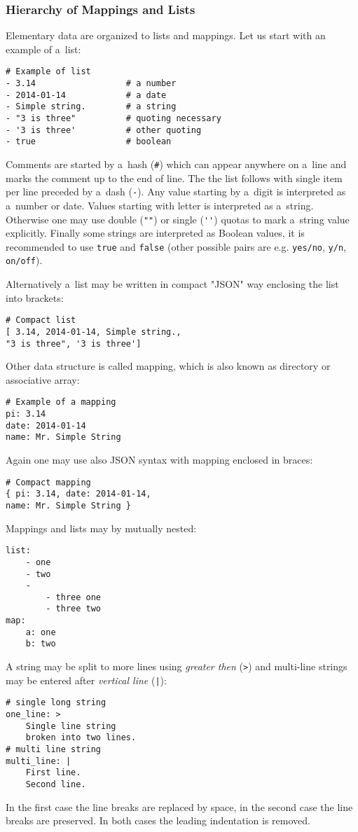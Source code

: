 \subsubsection{Hierarchy of Mappings and Lists}
Elementary data are organized to lists and mappings. Let us start with an example of a~list:
\begin{verbatim}
# Example of list 
- 3.14                  # a number
- 2014-01-14            # a date
- Simple string.        # a string
- "3 is three"          # quoting necessary
- '3 is three'          # other quoting
- true                  # boolean
\end{verbatim}
Comments are started by a~hash (\verb'#') which can appear anywhere on a~line and marks the comment up to the end of line.
The the list follows with single item per line preceded by a~dash (\verb'-'). Any value starting by a~digit is interpreted as a~number
or date. Values starting with letter is interpreted as a~string. Otherwise one may use double (\verb'""') or single (\verb"''") 
quotas to mark a~string value explicitly. Finally some strings are interpreted as Boolean values, it is recommended to use 
\verb'true' and \verb'false' (other possible pairs are e.g. \verb'yes/no', \verb'y/n', \verb'on/off'). 

Alternatively a~list may be written in compact "JSON" way enclosing the list into brackets:
\begin{verbatim}
# Compact list
[ 3.14, 2014-01-14, Simple string.,
"3 is three", '3 is three'] 
\end{verbatim}

Other data structure is called mapping, which is also known as directory or associative array:
\begin{verbatim}
# Example of a mapping
pi: 3.14
date: 2014-01-14   
name: Mr. Simple String
\end{verbatim}

Again one may use also JSON syntax with mapping enclosed in braces:
\begin{verbatim}
# Compact mapping
{ pi: 3.14, date: 2014-01-14,   
name: Mr. Simple String }
\end{verbatim}

Mappings and lists may by mutually nested:
\begin{verbatim}
list:
    - one
    - two
    - 
        - three one 
        - three two
map:
    a: one 
    b: two
\end{verbatim}

A string may be split to more lines using {\it greater then} (\verb'>') and multi-line strings may be entered after {\it vertical line} (\verb'|'):
\begin{verbatim}
# single long string
one_line: >
    Single line string
    broken into two lines.
# multi line string
multi_line: |
    First line.
    Second line.
\end{verbatim}
In the first case the line breaks are replaced by space, in the second case the line breaks are preserved.
In both cases the leading indentation is removed.


